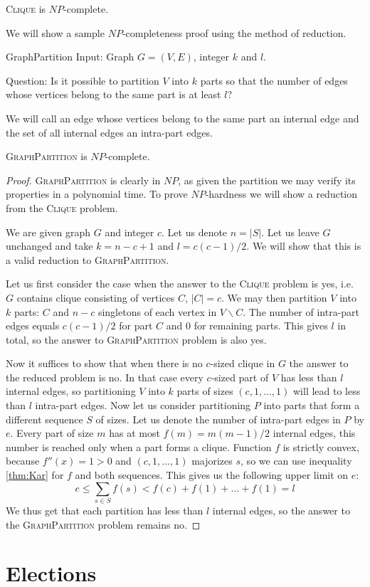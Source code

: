 \begin{thm}
\textsc{Clique} is $NP$-complete.
\end{thm}


We will show a sample $NP$-completeness proof using the method of reduction.

\begin{problem}{GraphPartition}
Input: Graph $G = (V, E)$, integer $k$ and $l$.

Question: Is it possible to partition $V$ into $k$ parts so that the number of edges
whose vertices belong to the same part is at least $l$?
\end{problem}

We will call an edge whose vertices belong to the same part an internal edge
and the set of all internal edges an intra-part edges.

\begin{thm}
\textsc{GraphPartition} is $NP$-complete.
\end{thm}

\begin{proof}
\textsc{GraphPartition} is clearly in $NP$,
as given the partition we may verify its properties in a polynomial time.
To prove $NP$-hardness we will show a reduction from the \textsc{Clique} problem.

We are given graph $G$ and integer $c$.
Let us denote $n = \left\vert{S}\right\vert $.
Let us leave $G$ unchanged and take $k = n-c+1$ and $l = c(c-1)/2$.
We will show that this is a valid reduction to \textsc{GraphPartition}.

Let us first consider the case when the answer to the \textsc{Clique} problem is yes,
i.e. $G$ contains clique consisting of vertices $C$, $\left\vert{C}\right\vert = c$.
We may then partition $V$ into $k$ parts: $C$ and $n-c$ singletons of each vertex in $V \backslash C$.
The number of intra-part edges equals $c(c-1)/2$ for part $C$ and $0$ for remaining parts.
This gives $l$ in total, so the answer to \textsc{GraphPartition} problem is also yes.

Now it suffices to show that when there is no $c$-sized clique in $G$
the answer to the reduced problem is no.
In that case every $c$-sized part of $V$ has less than $l$ internal edges,
so partitioning $V$ into $k$ parts of sizes $(c, 1, ..., 1)$ will lead to less than $l$ intra-part edges.
Now let us consider partitioning $P$ into parts that form a different sequence $S$ of sizes.
Let us denote the number of intra-part edges in $P$ by $e$.
Every part of size $m$ has at most $f(m) = m(m-1)/2$ internal edges,
this number is reached only when a part forms a clique.
Function $f$ is strictly convex, because $f''(x) = 1 > 0$ and $(c,1,...,1)$ majorizes $s$,
so we can use inequality \ref{thm:Kar} for $f$ and both sequences.
This gives us the following upper limit on $e$:
$$e \leq \sum_{s\in{S}} f(s) < f(c) + f(1) + ... + f(1) = l$$
We thus get that each partition has less than $l$ internal edges,
so the answer to the \textsc{GraphPartition} problem remains no.
\end{proof}

\section{Elections} 